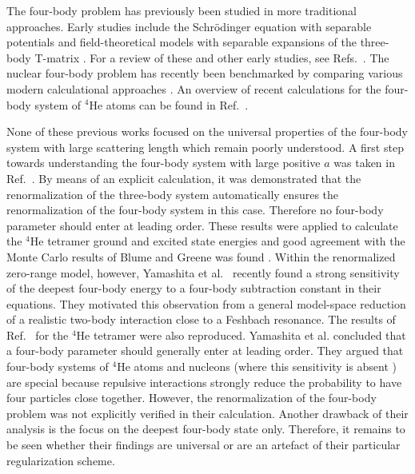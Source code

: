\documentclass[prc,preprint,showpacs,tightenlines,%
nofootinbib]{revtex4}
\begin{document}
The four-body problem has previously been studied in more traditional
approaches. Early studies include the Schr\"odinger equation 
with separable potentials \cite{Gibs76} and field-theoretical models with
separable expansions of the three-body T-matrix \cite{Fons76}.
For a review of these and other early studies, see 
Refs.~\cite{Tjon78,Lim84}. The nuclear four-body problem has recently
been benchmarked by comparing various modern calculational approaches
\cite{Kama01}. An overview of recent calculations for the four-body system
of $^4$He atoms can be found in Ref.~\cite{Blume:2000}.

None of these previous works focused on the universal properties of the 
four-body system with large scattering length which remain poorly
understood. A first step towards understanding the four-body system with
large positive $a$ was taken in Ref.~\cite{Platter04}.
By means of an explicit calculation, it was demonstrated
that the renormalization of the three-body system automatically 
ensures the renormalization of the four-body system
in this case. Therefore no four-body parameter should enter at leading order. 
These results were applied to calculate the $^4$He tetramer 
ground and excited state energies and good agreement with the 
Monte Carlo results of Blume and Greene was found \cite{Blume:2000}.  
Within the renormalized zero-range model, however,
Yamashita et al.~\cite{Yama06} recently found a strong sensitivity
of the deepest four-body energy
to a four-body subtraction constant in their equations.
They motivated this observation from a general model-space reduction
of a realistic two-body interaction close to a Feshbach resonance.
The results of Ref.~\cite{Platter04} for the $^4$He tetramer
were also reproduced. Yamashita et al. concluded that a four-body 
parameter should generally enter at leading order. They argued that 
four-body systems of $^4$He atoms and nucleons (where this sensitivity
is absent \cite{Platter04,Platter:2004zs,Nogga:2004ab}) 
are special because repulsive interactions strongly reduce 
the probability to have four particles close together.
However, the renormalization of the four-body problem was not explicitly 
verified in their calculation.
Another drawback of their analysis is the focus on the deepest four-body
state only. Therefore, it remains to be seen 
whether their findings are universal or are an artefact of 
their particular regularization scheme.
\end{document}
